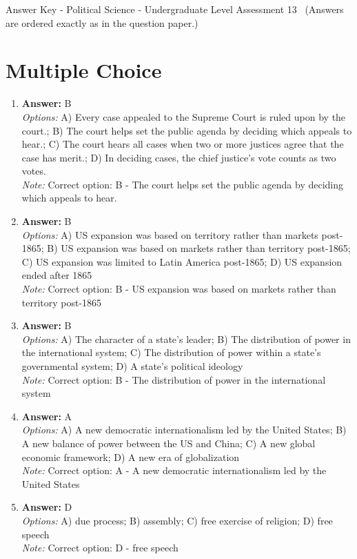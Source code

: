\documentclass[12pt]{article}
\begin{document}
\begin{center}
Answer Key - Political Science - Undergraduate Level Assessment 13 \
\small (Answers are ordered exactly as in the question paper.)
\end{center}

\section*{Multiple Choice}
\begin{enumerate}[label=\arabic*.]
\item \textbf{Answer:} B
\\ \textit{Options:} A) Every case appealed to the Supreme Court is ruled upon by the court.; B) The court helps set the public agenda by deciding which appeals to hear.; C) The court hears all cases when two or more justices agree that the case has merit.; D) In deciding cases, the chief justice's vote counts as two votes.
\\ \textit{Note:} Correct option: B - The court helps set the public agenda by deciding which appeals to hear.
\item \textbf{Answer:} B
\\ \textit{Options:} A) US expansion was based on territory rather than markets post-1865; B) US expansion was based on markets rather than territory post-1865; C) US expansion was limited to Latin America post-1865; D) US expansion ended after 1865
\\ \textit{Note:} Correct option: B - US expansion was based on markets rather than territory post-1865
\item \textbf{Answer:} B
\\ \textit{Options:} A) The character of a state's leader; B) The distribution of power in the international system; C) The distribution of power within a state's governmental system; D) A state's political ideology
\\ \textit{Note:} Correct option: B - The distribution of power in the international system
\item \textbf{Answer:} A
\\ \textit{Options:} A) A new democratic internationalism led by the United States; B) A new balance of power between the US and China; C) A new global economic framework; D) A new era of globalization
\\ \textit{Note:} Correct option: A - A new democratic internationalism led by the United States
\item \textbf{Answer:} D
\\ \textit{Options:} A) due process; B) assembly; C) free exercise of religion; D) free speech
\\ \textit{Note:} Correct option: D - free speech
\end{enumerate}
\end{document}
